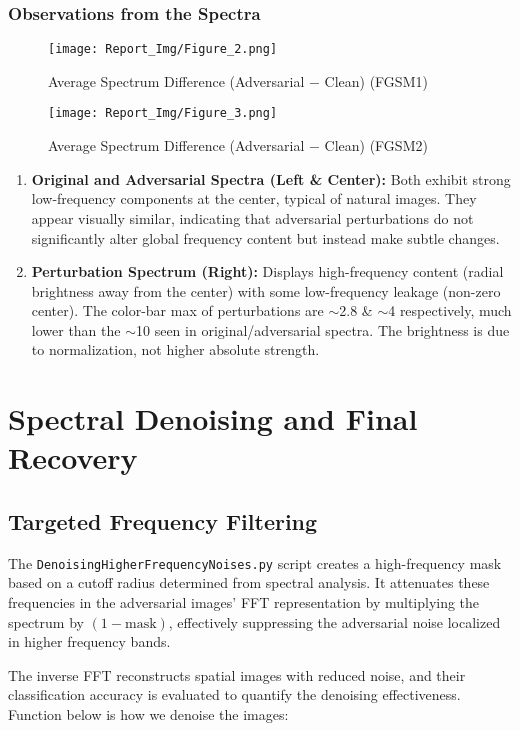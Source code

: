 \documentclass[a4paper,12pt]{report}
\begin{document}
\subsection{Observations from the Spectra}
\begin{figure}[H]
\centering
\texttt{[image: Report\_Img/Figure\_2.png]}
\caption{Average Spectrum Difference (Adversarial − Clean) (FGSM1)}
\end{figure}

\begin{figure}[H]
\centering
\texttt{[image: Report\_Img/Figure\_3.png]}
\caption{Average Spectrum Difference (Adversarial − Clean) (FGSM2)}
\end{figure}

\begin{enumerate}
    \item \textbf{Original and Adversarial Spectra (Left \& Center):} Both exhibit strong low-frequency components at the center, typical of natural images. They appear visually similar, indicating that adversarial perturbations do not significantly alter global frequency content but instead make subtle changes.

    \item \textbf{Perturbation Spectrum (Right):} Displays high-frequency content (radial brightness away from the center) with some low-frequency leakage (non-zero center). The color-bar max of perturbations are $\sim$2.8 \& $\sim$4 respectively, much lower than the $\sim$10 seen in original/adversarial spectra. The brightness is due to normalization, not higher absolute strength.
\end{enumerate}


\chapter{Spectral Denoising and Final Recovery}
\section{Targeted Frequency Filtering}
The \texttt{DenoisingHigherFrequencyNoises.py} script creates a high-frequency mask based on a cutoff radius determined from spectral analysis. It attenuates these frequencies in the adversarial images’ FFT representation by multiplying the spectrum by \((1 - \text{mask})\), effectively suppressing the adversarial noise localized in higher frequency bands.

The inverse FFT reconstructs spatial images with reduced noise, and their classification accuracy is evaluated to quantify the denoising effectiveness. Function below is how we denoise the images:
\end{document}
